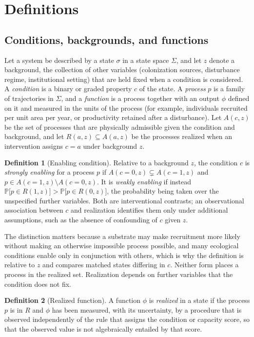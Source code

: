 \documentclass[11pt]{article}
\theoremstyle{definition}
\newtheorem{definition}{Definition}
\theoremstyle{remark}
\renewcommand{\Pr}{\mathbb{P}}
\begin{document}
\section{Definitions}

\subsection{Conditions, backgrounds, and functions}

Let a system be described by a state $\sigma$ in a state space $\Sigma$, and let $z$ denote a background, the collection of other variables (colonization sources, disturbance regime, institutional setting) that are held fixed when a condition is considered. A \emph{condition} is a binary or graded property $c$ of the state. A \emph{process} $p$ is a family of trajectories in $\Sigma$, and a \emph{function} is a process together with an output $\phi$ defined on it and measured in the units of the process (for example, individuals recruited per unit area per year, or productivity retained after a disturbance). Let $A(c,z)$ be the set of processes that are physically admissible given the condition and background, and let $R(a,z)\subseteq A(a,z)$ be the processes realized when an intervention assigns $c=a$ under background $z$.

\begin{definition}[Enabling condition]\label{def:enabling}
Relative to a background $z$, the condition $c$ is \emph{strongly enabling} for a process $p$ if $A(c{=}0,z)\subsetneq A(c{=}1,z)$ and $p\in A(c{=}1,z)\setminus A(c{=}0,z)$. It is \emph{weakly enabling} if instead $\Pr\bigl[p\in R(1,z)\bigr]>\Pr\bigl[p\in R(0,z)\bigr]$, the probability being taken over the unspecified further variables. Both are interventional contrasts; an observational association between $c$ and realization identifies them only under additional assumptions, such as the absence of confounding of $c$ given $z$.
\end{definition}

The distinction matters because a substrate may make recruitment more likely without making an otherwise impossible process possible, and many ecological conditions enable only in conjunction with others, which is why the definition is relative to $z$ and compares matched states differing in $c$. Neither form places a process in the realized set. Realization depends on further variables that the condition does not fix.

\begin{definition}[Realized function]\label{def:realized}
A function $\phi$ is \emph{realized} in a state if the process $p$ is in $R$ and $\phi$ has been measured, with its uncertainty, by a procedure that is observed independently of the rule that assigns the condition or capacity score, so that the observed value is not algebraically entailed by that score.
\end{definition}
\end{document}
